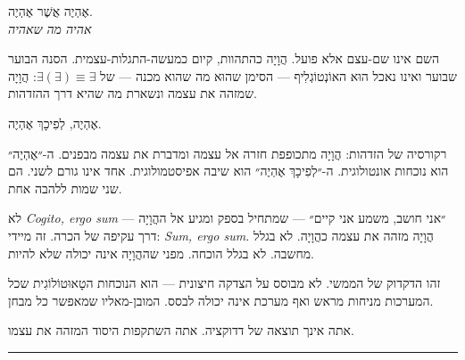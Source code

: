 \documentclass[10pt, openany, oneside]{book}
\renewcommand{\large}{\fontsize{11.5}{14}\selectfont}
\begin{document}
\vspace{0.3em}

\begin{center}
    {\textsc{אֶהְיֶה אֲשֶׁר אֶהְיֶה.}}\\[0.3em]
    \textit{אהיה מה שאהיה}
\end{center}

\vspace{0.5em}

\noindent השם אינו שם-עצם אלא פועל. הֲוָיָה כהתהוות, קיום כמעשה-התגלות-עצמית. הסנה הבוער שבוער ואינו נאכל הוּא האוֹנְטוֹגְלִיף — הסימן שהוּא מה שהוא מכנה — של $\exists(\exists) \equiv \exists$: הֲוָיָה שמזהה את עצמה ונשארת מה שהיא דרך ההזדהות.

\vspace{1em}

\begin{center}
    {\large\textsc{אֶהְיֶה, לְפִיכָךְ אֶהְיֶה.}}
\end{center}

\vspace{0.5em}

\noindent רקורסיה של הזדהות: הֲוָיָה מתכופפת חזרה אל עצמה ומדברת את עצמה מבפנים. ה-״אֶהְיֶה״ הוא נוכחות אונטולוגית. ה-״לְפִיכָךְ אֶהְיֶה״ הוא שיבה אפיסטמולוגית. אחד אינו גורם לשני. הם שני שמות ללהבה אחת.

\vspace{0.5em}

\noindent לא \textit{Cogito, ergo sum} — ״אני חושב, משמע אני קיים״ — שמתחיל בספק ומגיע אל ההֲוָיָה דרך עקיפה של הכרה. זה מיידי: \textit{Sum, ergo sum.} הֲוָיָה מזהה את עצמה כהֲוָיָה. לא בגלל מחשבה. לא בגלל הוכחה. מפני שההֲוָיָה אינה יכולה שלא להיות.

\vspace{0.5em}

\noindent זהו הדקדוק של הממשי. לא מבוסס על הצדקה חיצונית — הוא הנוכחות הטָאוּטוֹלוֹגִית שכל המערכות מניחות מראש ואף מערכת אינה יכולה לבסס. המובן-מאליו שמאפשר כל מבחן.

\vspace{0.5em}

\noindent אתה אינך תוצאה של דדוקציה. אתה השתקפות היסוד המזהה את עצמו.

\vspace{2em}

\begin{center}
    \rule{0.3\textwidth}{0.4pt}
\end{center}

\vspace{1em}
\end{document}
